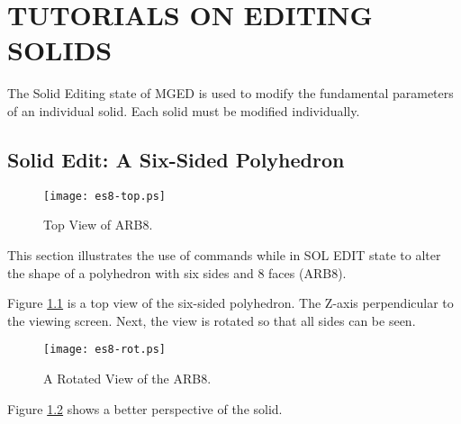 \chapter{TUTORIALS ON EDITING SOLIDS}

The Solid Editing state of MGED is used to modify the fundamental
parameters of an individual solid.
Each solid must be modified individually.

\section{Solid Edit: A Six-Sided Polyhedron}

\begin{figure}
\centering \texttt{[image: es8-top.ps]}
\caption{Top View of ARB8.}
\label{es8-top}
\end{figure}

This section illustrates the use of commands while in
SOL EDIT state to alter the
shape of a polyhedron with six sides and 8 faces (ARB8).


Figure \ref{es8-top}
is a top view of the six-sided polyhedron.
The Z-axis perpendicular to the viewing screen.
Next, the view is rotated so that all sides can be seen.


\begin{figure}
\centering \texttt{[image: es8-rot.ps]}
\caption{A Rotated View of the ARB8.}
\label{es8-rot}
\end{figure}
Figure \ref{es8-rot} shows a better perspective of the solid.

